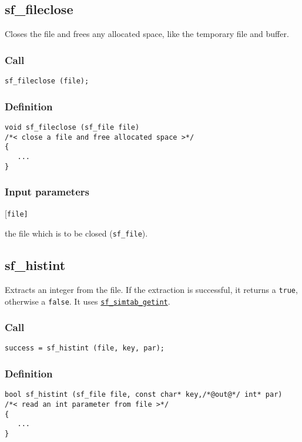 \subsection{{sf\_fileclose}}
Closes the file and frees any allocated space, like the temporary file and buffer.

\subsubsection*{Call}
\begin{verbatim}sf_fileclose (file);\end{verbatim}

\subsubsection*{Definition}
\begin{verbatim}
void sf_fileclose (sf_file file) 
/*< close a file and free allocated space >*/
{
   ...    
}
\end{verbatim}

\subsubsection*{Input parameters}
\begin{desclist}{\tt }{\quad}[\tt file]
   \setlength\itemsep{0pt}
   \item[file] the file which is to be closed (\texttt{sf\_file}).
\end{desclist}




\subsection{{sf\_histint}}
Extracts an integer from the file. If the extraction is successful, it returns a \texttt{true}, otherwise a \texttt{false}. It uses \hyperref[sec:sf_simtab_getint]{\texttt{sf\_simtab\_getint}}.

\subsubsection*{Call}
\begin{verbatim}success = sf_histint (file, key, par);\end{verbatim}

\subsubsection*{Definition}
\begin{verbatim}
bool sf_histint (sf_file file, const char* key,/*@out@*/ int* par)
/*< read an int parameter from file >*/ 
{
   ...
}
\end{verbatim}

